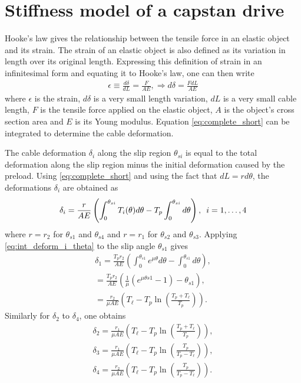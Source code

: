 \section{Stiffness model of a capstan drive}
Hooke's law gives the relationship between the tensile force in an elastic object and its strain. The strain of an elastic object is also defined as its variation in length over its original length. Expressing this definition of strain in an infinitesimal form and equating it to Hooke's law, one can then write
\begin{align}
\epsilon \equiv \frac{d\delta}{dL} = \frac{F}{AE}, \Rightarrow d\delta = \frac{FdL}{AE}
\label{eq:complete_short}
\end{align}
where $\epsilon$ is the strain, $d\delta$ is a very small length variation, $dL$ is a very small cable length, $F$ is the tensile force applied on the elastic object, $A$ is the object's  cross section area and $E$ is its Young modulus. Equation \eqref{eq:complete_short} can be integrated to determine the cable deformation.
\par
The  cable deformation $\delta_i$ along the slip region $\theta_{si}$ is equal to the total deformation along the slip region minus the initial deformation caused by the preload.  Using \eqref{eq:complete_short} and using the fact that $dL=rd\theta$, the deformations $\delta_i$ are obtained as 
\begin{align}
    \delta_i = \frac{r}{AE}\left(\int_0^{\theta_{si}}T_i(\theta)d\theta-T_p\int_0^{\theta_{si}}d\theta\right),\hquad i=1,\ldots ,4 \label{eq:int_deform_i_theta}
\end{align}
where $r = r_2$ for $\theta_{s1}$ and $\theta_{s4}$ and $r = r_1$ for $\theta_{s2}$ and $\theta_{s3}$.
Applying \eqref{eq:int_deform_i_theta} to the slip angle $\theta_{s1}$ gives
\begin{align}
    \delta_1 = \frac{T_pr_2}{AE}\left(\int_0^{\theta_{s1}}e^{\mu\theta} d\theta-\int_0^{\theta_{s1}}d\theta\right), \\
    = \frac{T_pr_2}{AE}\left(\frac{1}{\mu}\left(e^{\mu\theta{s1}} -1\right)-\theta_{s1}\right),\\
    =\frac{r_2}{\mu AE}\left(T_\ell-T_p\ln\left(\frac{T_p+T_\ell}{T_p}\right)\right)\label{eq:defo1}.
\end{align}
Similarly for $\delta_2$ to $\delta_4$, one obtains 
\begin{align}
    \delta_2=\frac{r_1}{\mu AE}\left(T_\ell-T_p\ln\left(\frac{T_p+T_\ell}{T_p}\right)\right),\label{eq:defo2}\\
    \delta_3= \frac{r_1}{\mu AE}\left(T_\ell-T_p\ln\left(\frac{T_p}{T_p-T_\ell}\right)\right),\label{eq:defo3}\\
    \delta_4 =\frac{r_2}{\mu AE}\left(T_\ell-T_p\ln\left(\frac{T_p}{T_p-T_\ell}\right)\right).\label{eq:defo4}
\end{align}
